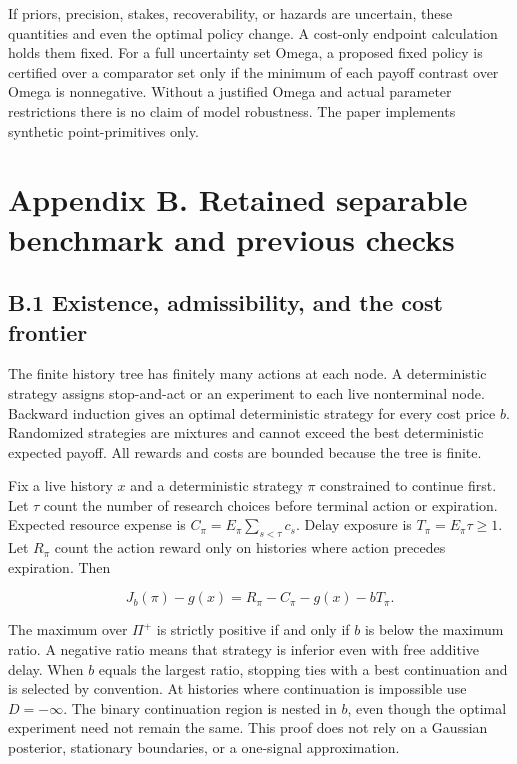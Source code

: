 \documentclass[
  11pt,
]{article}
\begin{document}
If priors, precision, stakes, recoverability, or hazards are uncertain,
these quantities and even the optimal policy change. A cost-only
endpoint calculation holds them fixed. For a full uncertainty set Omega,
a proposed fixed policy is certified over a comparator set only if the
minimum of each payoff contrast over Omega is nonnegative. Without a
justified Omega and actual parameter restrictions there is no claim of
model robustness. The paper implements synthetic point-primitives only.

\section{Appendix B. Retained separable benchmark and previous
checks}\label{appendix-b.-retained-separable-benchmark-and-previous-checks}

\subsection{B.1 Existence, admissibility, and the cost
frontier}\label{b.1-existence-admissibility-and-the-cost-frontier}

The finite history tree has finitely many actions at each node. A
deterministic strategy assigns stop-and-act or an experiment to each
live nonterminal node. Backward induction gives an optimal deterministic
strategy for every cost price \(b\). Randomized strategies are mixtures
and cannot exceed the best deterministic expected payoff. All rewards
and costs are bounded because the tree is finite.

Fix a live history \(x\) and a deterministic strategy \(\pi\)
constrained to continue first. Let \(\tau\) count the number of research
choices before terminal action or expiration. Expected resource expense
is \(C_\pi=E_\pi\sum_{s<\tau}c_s\). Delay exposure is
\(T_\pi=E_\pi\tau\geq1\). Let \(R_\pi\) count the action reward only on
histories where action precedes expiration. Then

\[J_b(\pi)-g(x)=R_\pi-C_\pi-g(x)-bT_\pi.\]

The maximum over \(\Pi^+\) is strictly positive if and only if \(b\) is
below the maximum ratio. A negative ratio means that strategy is
inferior even with free additive delay. When \(b\) equals the largest
ratio, stopping ties with a best continuation and is selected by
convention. At histories where continuation is impossible use
\(D=-\infty\). The binary continuation region is nested in \(b\), even
though the optimal experiment need not remain the same. This proof does
not rely on a Gaussian posterior, stationary boundaries, or a one-signal
approximation.
\end{document}
